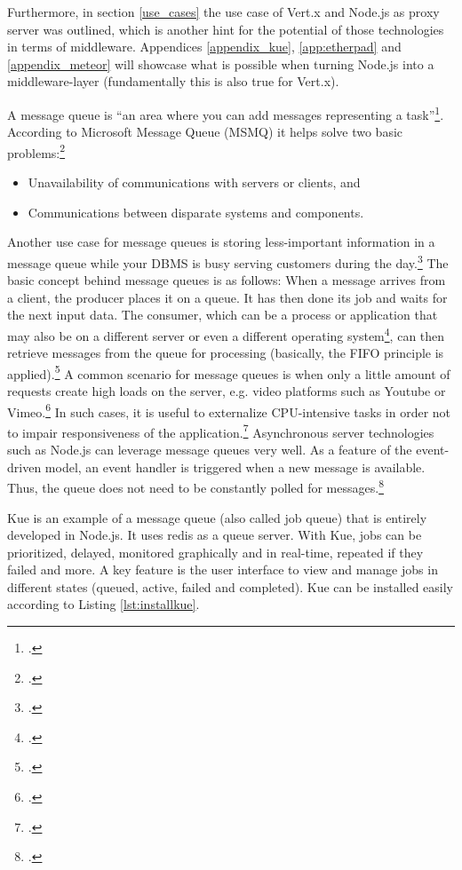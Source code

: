 \begin{appendices}
\begin{subappendices}
Furthermore, in section \ref{use_cases} the use case of Vert.x and Node.js as proxy server was outlined, which is another hint for the potential of those technologies in terms of middleware. Appendices \ref{appendix_kue}, \ref{app:etherpad} and \ref{appendix_meteor} will showcase what is possible when turning Node.js into a middleware-layer (fundamentally this is also true for Vert.x). 
\newpage

\label{appendix_kue}

A message queue is “an area where you can add messages representing a task”\footcite[][]{McGlennon_2007}. According to Microsoft Message Queue (MSMQ) it helps solve two basic problems:\footcite[Cf.][]{McGlennon_2007}
\begin{itemize}
  \item Unavailability of communications with servers or clients, and 
  \item Communications between disparate systems and components.
\end{itemize}
Another use case for message queues is storing less-important information in a message queue while your DBMS is busy serving customers during the day.\footcite[Cf.][449]{Thomson_2002}
The basic concept behind message queues is as follows: When a message arrives from a client, the producer places it on a queue. It has then done its job and waits for the next input data. The consumer, which can be a process or application that may also be on a different server or even a different operating system\footcite[Cf.][]{McGlennon_2007}, can then retrieve messages from the queue for processing (basically, the FIFO principle is applied).\footcite[Cf.][450]{Thomson_2002}
A common scenario for message queues is when only a little amount of requests create high loads on the server, e.g. video platforms such as Youtube or Vimeo.\footcite[Cf.][247]{Roden_2012} In such cases, it is useful to externalize CPU-intensive tasks in order not to impair responsiveness of the application.\footcite[Cf.][247]{Roden_2012}
Asynchronous server technologies such as Node.js can leverage message queues very well. As a feature of the event-driven model, an event handler is triggered when a new message is available. Thus, the queue does not need to be constantly polled for messages.\footcite[Cf.][]{Knight_2011}

Kue is an example of a message queue (also called job queue) that is entirely developed in Node.js. It uses redis as a queue server. With Kue, jobs can be prioritized, delayed, monitored graphically and in real-time, repeated if they failed and more. A key feature is the user interface to view and manage jobs in different states (queued, active, failed and completed). Kue can be installed easily according to Listing \ref{lst:installkue}.


\end{subappendices}
\end{appendices}
